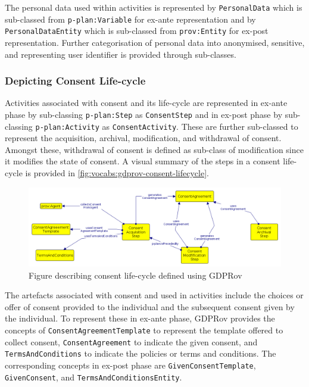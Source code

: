 The personal data used within activities is represented by \texttt{PersonalData} which is sub-classed from \texttt{p-plan:Variable} for ex-ante representation and by \texttt{PersonalDataEntity} which is sub-classed from \texttt{prov:Entity} for ex-post representation.
Further categorisation of personal data into anonymised, sensitive, and representing user identifier is provided through sub-classes.

\subsubsection{Depicting Consent Life-cycle}
Activities associated with consent and its life-cycle are represented in ex-ante phase by sub-classing \texttt{p-plan:Step} as \texttt{ConsentStep} and in ex-post phase by sub-classing \texttt{p-plan:Activity} as \texttt{ConsentActivity}.
These are further sub-classed to represent the acquisition, archival, modification, and withdrawal of consent.
Amongst these, withdrawal of consent is defined as sub-class of modification since it modifies the state of consent.
A visual summary of the steps in a consent life-cycle is provided in \autoref{fig:vocabs:gdprov-consent-lifecycle}.
\begin{figure}[htbp]
    \centering
    \includegraphics[width=\linewidth]{img/GDPRov_consent_lifecycle.png}
    \caption{Figure describing consent life-cycle defined using GDPRov}
    \label{fig:vocabs:gdprov-consent-lifecycle}
\end{figure}

The artefacts associated with consent and used in activities include the choices or offer of consent provided to the individual and the subsequent consent given by the individual.
To represent these in ex-ante phase, GDPRov provides the concepts of \texttt{ConsentAgreementTemplate} to represent the template offered to collect consent, \texttt{ConsentAgreement} to indicate the given consent, and \texttt{TermsAndConditions} to indicate the policies or terms and conditions.
The corresponding concepts in ex-post phase are \texttt{GivenConsentTemplate}, \texttt{GivenConsent}, and \texttt{TermsAndConditionsEntity}.

